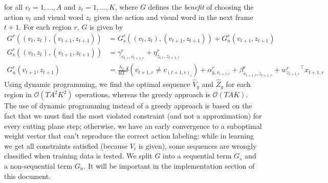 \documentclass[10pt,letterpaper]{article}
\newcommand{\+}[1]{\ensuremath{{\boldsymbol #1}}}
\begin{document}
for all $v_t = 1,\dots,A$ and $z_t = 1,\dots,K$, where $G$ defines the \emph{benefit} of choosing the action $v_t$ and visual word $z_{t}$ given the action and visual word in the next frame ${t+1}$. For each region $r$, $G$ is given by
\begin{equation}
\begin{split}
G^r((v_t,z_t),(v_{t+1},z_{t+1})) & =  G^r_s((v_t,z_t),(v_{t+1},z_{t+1})) + G^r_n(v_{t+1},z_{t+1})
\end{split}
\end{equation}
\begin{equation}
\begin{split}
G^r_s((v_t,z_t),(v_{t+1},z_{t+1})) & =\gamma^r_{v_{t,r},v_{t+1,r}}+ \eta^r_{z_{t,r},z_{t+1,r}} \\
G^r_n(v_{t+1},z_{t+1}) & = \frac{\lambda_2}{RT}\delta(v_{t+1,r} \neq v_{{(t+1,r)}_i}) + \alpha^r_{y,v_{t+1,r}} 
                  + \beta^r_{v_{t+1,r},z_{t+1,r}} + {w^r_{z_{t+1,r}}}^\top x_{t+1,r}
\end{split}
\end{equation}
%
Using dynamic programming, we find the optimal sequence $\hat{V}_y$ and $\hat{Z}_y$ for each region in $\mathcal{O}(TA^2K^2)$ operations, whereas the greedy approach is $\mathcal{O}(TAK)$. The use of dynamic programming instead of a greedy approach is based on the fact that we must find the most violated constraint (and not a approximation) for every cutting plane step; otherwise, we have an early convergence to a suboptimal weight vector that can't reproduce the correct action labeling: while in learning we get all constraints satisfied (because $V_i$ is given), some sequences are wrongly classified when training data is tested.  
We split $G$ into a sequential term $G_s$ and a non-sequential term $G_n$. It will be important in the implementation section of this document. 
\end{document}
